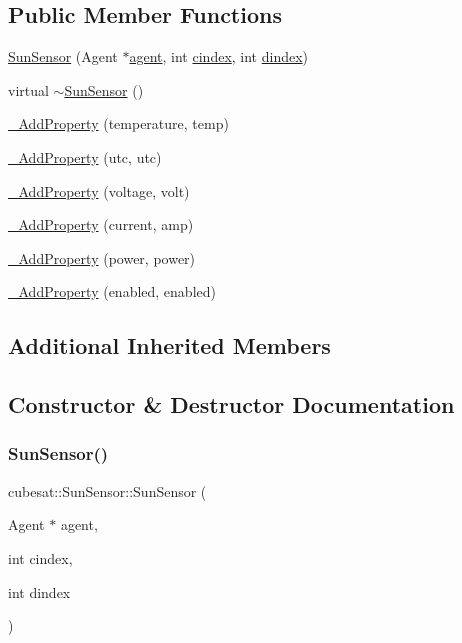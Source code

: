 \subsection*{Public Member Functions}
\begin{DoxyCompactItemize}
\item 
\hyperlink{classcubesat_1_1SunSensor_ab2ece1cd2b2f74107b486a1e7a5676a4}{Sun\+Sensor} (Agent $\ast$\hyperlink{classcubesat_1_1Device_a8499108eccaf7375bea8ead0182391a6}{agent}, int \hyperlink{classcubesat_1_1Device_a1deca725b01f8ef37e49662da6db4e53}{cindex}, int \hyperlink{classcubesat_1_1Device_a8a2b3d6d7400e6796c31705058172982}{dindex})
\item 
virtual \hyperlink{classcubesat_1_1SunSensor_aa07abb6c1a1ebccbfb089056b1c21cdb}{$\sim$\+Sun\+Sensor} ()
\item 
\hyperlink{classcubesat_1_1SunSensor_a452bee7c86689b163d3702e9c692c59c}{\+\_\+\+Add\+Property} (temperature, temp)
\item 
\hyperlink{classcubesat_1_1SunSensor_a724284a03bf6c4d84a9b13d6d8efe81c}{\+\_\+\+Add\+Property} (utc, utc)
\item 
\hyperlink{classcubesat_1_1SunSensor_ad5ffda42cfe3c9f888a24de4fb33d698}{\+\_\+\+Add\+Property} (voltage, volt)
\item 
\hyperlink{classcubesat_1_1SunSensor_aee109bb5c5ef616b1fb4041ec22afc39}{\+\_\+\+Add\+Property} (current, amp)
\item 
\hyperlink{classcubesat_1_1SunSensor_a14b2a6143a9a07725b73a71b4eea8536}{\+\_\+\+Add\+Property} (power, power)
\item 
\hyperlink{classcubesat_1_1SunSensor_abd429085c8bde7339acbbaf4b1d30e0d}{\+\_\+\+Add\+Property} (enabled, enabled)
\end{DoxyCompactItemize}
\subsection*{Additional Inherited Members}


\subsection{Constructor \& Destructor Documentation}
\mbox{\label{classcubesat_1_1SunSensor_ab2ece1cd2b2f74107b486a1e7a5676a4}} 
\subsubsection{\texorpdfstring{Sun\+Sensor()}{SunSensor()}}
{\footnotesize\ttfamily cubesat\+::\+Sun\+Sensor\+::\+Sun\+Sensor (\begin{DoxyParamCaption}\item[{Agent $\ast$}]{agent,  }\item[{int}]{cindex,  }\item[{int}]{dindex }\end{DoxyParamCaption})\hspace{0.3cm}{\ttfamily [inline]}}

